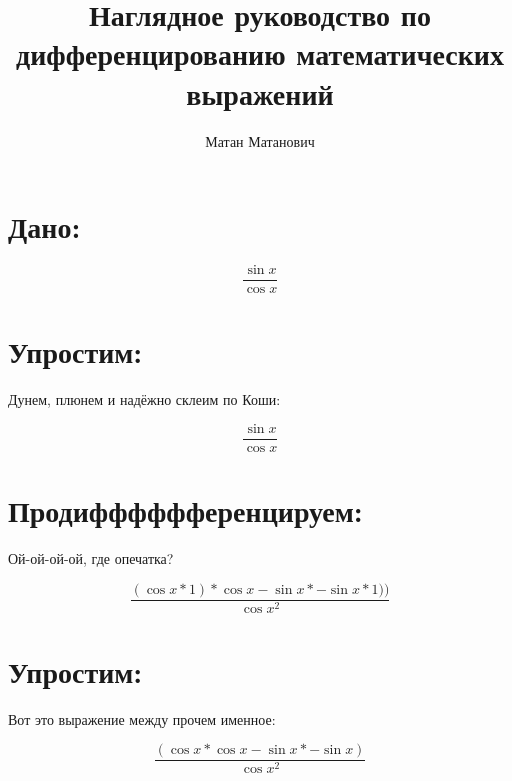 \documentclass[12pt]{article}
\title{Наглядное руководство по дифференцированию математических выражений}
\author{Матан Матанович}
\begin{document}
\maketitle
\newpage


\section{Дано:}

$$ \frac{\sin{ x } }{ \cos{ x } }  $$

\section{Упростим:}

Дунем, плюнем и надёжно склеим по Коши:

$$ \frac{\sin{ x } }{ \cos{ x } }  $$

\section{Продифффффференцируем:}

Ой-ой-ой-ой, где опечатка?

$$ \frac{(\cos{ x } *  1 ) * \cos{ x } - \sin{ x } * -{\sin{ x }} *  1 )) }{ \cos{ x } ^  2  }  $$

\section{Упростим:}

Вот это выражение между прочем именное:

$$ \frac{(\cos{ x } * \cos{ x } - \sin{ x } * -{\sin{ x }}) }{ \cos{ x } ^  2  }  $$
\end{document}
